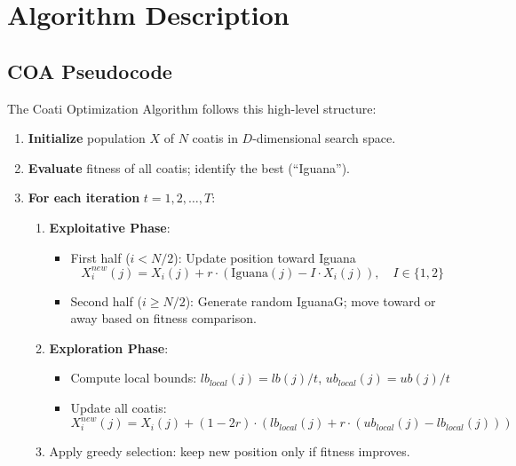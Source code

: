 \documentclass[12pt, a4paper]{article}
\begin{document}
\section{Algorithm Description}

\subsection{COA Pseudocode}

The Coati Optimization Algorithm follows this high-level structure:

\begin{enumerate}
    \item \textbf{Initialize} population $X$ of $N$ coatis in $D$-dimensional search space.
    \item \textbf{Evaluate} fitness of all coatis; identify the best (``Iguana'').
    \item \textbf{For each iteration} $t = 1, 2, \ldots, T$:
    \begin{enumerate}[label=\alph*.]
        \item \textbf{Exploitative Phase}:
        \begin{itemize}
            \item First half ($i < N/2$): Update position toward Iguana
            \[
                X_i^{new}(j) = X_i(j) + r \cdot \left( \text{Iguana}(j) - I \cdot X_i(j) \right), \quad I \in \{1, 2\}
            \]
            \item Second half ($i \geq N/2$): Generate random IguanaG; move toward or away based on fitness comparison.
        \end{itemize}
        \item \textbf{Exploration Phase}:
        \begin{itemize}
            \item Compute local bounds: $lb_{local}(j) = lb(j)/t$, $ub_{local}(j) = ub(j)/t$
            \item Update all coatis:
            \[
                X_i^{new}(j) = X_i(j) + (1 - 2r) \cdot \left( lb_{local}(j) + r \cdot (ub_{local}(j) - lb_{local}(j)) \right)
            \]
        \end{itemize}
        \item Apply greedy selection: keep new position only if fitness improves.
    \end{enumerate}
\end{enumerate}
\end{document}
